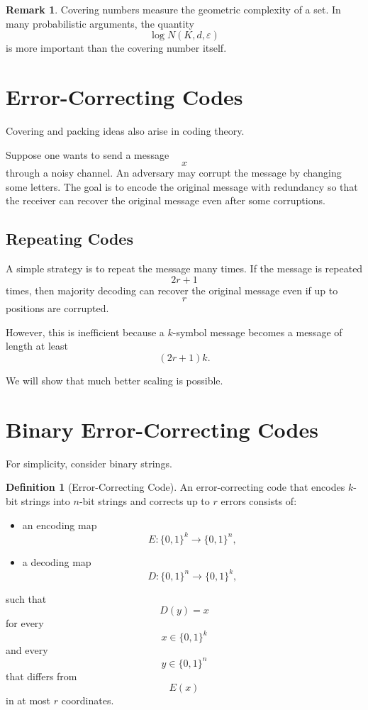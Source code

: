 \documentclass[12pt,oneside]{book}
\numberwithin{equation}{section}
\theoremstyle{definition}
\newtheorem{definition}{Definition}[section]
\newtheorem{remark}{Remark}[section]
\theoremstyle{plain}
\theoremstyle{remark}
\begin{document}
\begin{remark}
Covering numbers measure the geometric complexity of a set. In many probabilistic arguments, the quantity
\[
\log N(K,d,\varepsilon)
\]
is more important than the covering number itself.
\end{remark}

\section{Error-Correcting Codes}

Covering and packing ideas also arise in coding theory.

Suppose one wants to send a message
\[
x
\]
through a noisy channel. An adversary may corrupt the message by changing some letters. The goal is to encode the original message with redundancy so that the receiver can recover the original message even after some corruptions.

\subsection{Repeating Codes}

A simple strategy is to repeat the message many times. If the message is repeated
\[
2r+1
\]
times, then majority decoding can recover the original message even if up to
\[
r
\]
positions are corrupted.

However, this is inefficient because a $k$-symbol message becomes a message of length at least
\[
(2r+1)k.
\]

We will show that much better scaling is possible.

\section{Binary Error-Correcting Codes}

For simplicity, consider binary strings.

\begin{definition}[Error-Correcting Code]
An error-correcting code that encodes $k$-bit strings into $n$-bit strings and corrects up to $r$ errors consists of:
\begin{itemize}
\item an encoding map
\[
E:\{0,1\}^k\to\{0,1\}^n,
\]
\item a decoding map
\[
D:\{0,1\}^n\to\{0,1\}^k,
\]
\end{itemize}
such that
\[
D(y)=x
\]
for every
\[
x\in\{0,1\}^k
\]
and every
\[
y\in\{0,1\}^n
\]
that differs from
\[
E(x)
\]
in at most $r$ coordinates.
\end{definition}
\end{document}
